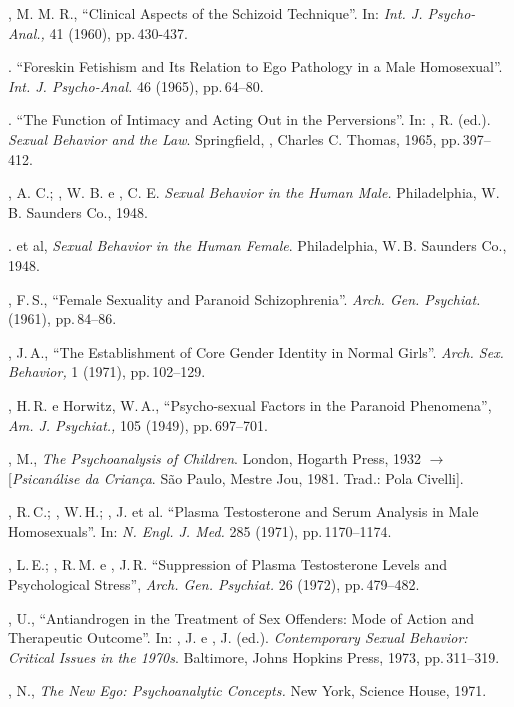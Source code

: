 \begin{description}
, M. M. R., ``Clinical Aspects of the Schizoid
Technique''. In: \textit{Int. J. Psycho-Anal., } 41 (1960), pp.\,430-437.

. ``Foreskin Fetishism and Its Relation to Ego
Pathology in a Male Homosexual''. \textit{Int. J. Psycho-Anal. } 46
(1965), pp.\,64--80.

. ``The Function of Intimacy and Acting Out in the
Perversions''. In: , R. (ed.). \textit{Sexual Behavior and the 
Law}. Springfield, , Charles C. Thomas, 1965, pp.\,397--412.

, A. C.; , W. B. e , C. E. 
\textit{Sexual Behavior in the Human Male. }Philadelphia, W. B. Saunders Co., 1948.

. et al, \textit{Sexual Behavior in the Human Female}. 
Philadelphia, W.\,B. Saunders Co., 1948.

, F.\,S., ``Female Sexuality and Paranoid
Schizophrenia''. \textit{Arch. Gen. Psychiat. } (1961), pp.\,84--86.

, J.\,A., ``The Establishment of Core Gender Identity in
Normal Girls''. \textit{ Arch. Sex. Behavior, } 1 (1971), pp.\,102--129.

, H.\,R. e Horwitz, W.\,A., ``Psycho-sexual Factors in the
Paranoid Phenomena'', \textit{Am. J. Psychiat., } 105 (1949), pp.\,697--701.

, M., \textit{The Psychoanalysis of Children}. London, Hogarth Press, 1932
{$\bm{\rightarrow}$} [\textit{Psicanálise da Criança}. São Paulo, Mestre Jou, 1981. Trad.: Pola
Civelli].

, R.\,C.; , W.\,H.; , J. et al. ``Plasma
Testosterone and Serum Analysis in Male Homosexuals''. In: \textit{N.
Engl. J. Med. } 285 (1971), pp.\,1170--1174.

, L.\,E.; , R.\,M. e , J.\,R. ``Suppression of
Plasma Testosterone Levels and Psychological Stress'', \textit{Arch.
Gen. Psychiat.} 26 (1972), pp.\,479--482.

, U., ``Antiandrogen in the Treatment of Sex Offenders:
Mode of Action and Therapeutic Outcome''. In: , J. e 
, J. (ed.). \textit{Contemporary
Sexual Behavior: Critical Issues in the 1970s}. Baltimore, Johns Hopkins Press, 
1973, pp.\,311--319.

, N., \textit{The New Ego: Psychoanalytic Concepts. }New York, Science
House, 1971.


\end{description}
